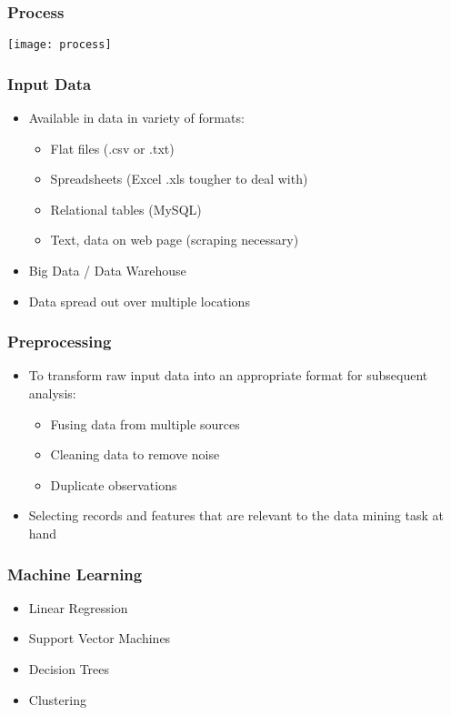 \begin{frame}[fragile]\frametitle{Process}
\begin{center}
\texttt{[image: process]}
\end{center}
\end{frame}


\begin{frame}[fragile]\frametitle{Input Data}
\begin{itemize}
\item Available in data in variety of formats:
	\begin{itemize}
	\item Flat files (.csv or .txt)
	\item Spreadsheets (Excel .xls tougher to deal with)
	\item Relational tables (MySQL)
	\item Text, data on web page (scraping necessary)
	\end{itemize}
\item Big Data / Data Warehouse
\item Data spread out over multiple locations
\end{itemize}
\end{frame}


\begin{frame}[fragile]\frametitle{Preprocessing}
\begin{itemize}
\item To transform raw input data into an appropriate format for subsequent analysis:
	\begin{itemize}
	\item Fusing data from multiple sources
	\item Cleaning data to remove noise
	\item Duplicate observations
	\end{itemize}
\item Selecting records and features that are relevant to the data mining task at hand
\end{itemize}
\end{frame}

\begin{frame}[fragile]\frametitle{Machine Learning}
\begin{itemize}
\item Linear Regression
\item Support Vector Machines
\item Decision Trees
\item Clustering
\end{itemize}
\end{frame}


